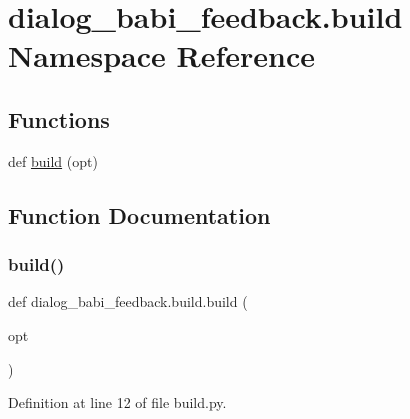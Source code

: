 \hypertarget{namespacedialog__babi__feedback_1_1build}{}\section{dialog\+\_\+babi\+\_\+feedback.\+build Namespace Reference}
\label{namespacedialog__babi__feedback_1_1build}
\subsection*{Functions}
\begin{DoxyCompactItemize}
\item 
def \hyperlink{namespacedialog__babi__feedback_1_1build_a7a9d289f7493a5ded13c4b7f071b6184}{build} (opt)
\end{DoxyCompactItemize}


\subsection{Function Documentation}
\mbox{\label{namespacedialog__babi__feedback_1_1build_a7a9d289f7493a5ded13c4b7f071b6184}} 
\subsubsection{\texorpdfstring{build()}{build()}}
{\footnotesize\ttfamily def dialog\+\_\+babi\+\_\+feedback.\+build.\+build (\begin{DoxyParamCaption}\item[{}]{opt }\end{DoxyParamCaption})}



Definition at line 12 of file build.\+py.


